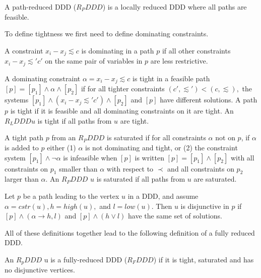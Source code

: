 \begin{mydef}
A path-reduced DDD ($R_PDDD$) is a locally reduced DDD where all paths are feasible.
\end{mydef}

To define tightness we first need to define dominating constraints.

\begin{mydef}
A constraint $x_i - x_j \lesssim c$ is dominating in a path $p$ if all other constraints $x_i - x_j \lesssim' c'$ on the same pair of variables in $p$ are less restrictive.
\end{mydef}

\begin{mydef}
A dominating constraint $\alpha = x_i - x_j \lesssim c$ is tight in a feasible path $[p] = [p_1] \wedge \alpha \wedge [p_2]$ if for all tighter constraints $(c', \lesssim') < (c,\lesssim),$ the systems $[p_1] \wedge (x_i - x_j \lesssim' c') \wedge [p_2]$ and $[p]$ have different solutions. A path $p$ is tight if it is feasible and all dominating constraints on it are tight. An $R_LDDD u$ is tight if all paths from $u$ are tight. 
\end{mydef}

\begin{mydef}
A tight path $p$ from an $R_PDDD$ is saturated if for all constraints $\alpha$ not on $p$, if $\alpha$ is added to $p$ either (1) $\alpha$ is not dominating and tight, or (2) the constraint system $[p_1] \wedge \neg\alpha$ is infeasible when $[p]$ is written $[p] = [p_1] \wedge [p_2]$ with all constraints on $p_1$ smaller than $\alpha$ with respect to $\prec$ and all constraints on $p_2$ larger than $\alpha$. An $R_PDDD$ $u$ is saturated if all paths from $u$ are saturated.
\end{mydef}

\begin{mydef}
Let $p$ be a path leading to the vertex $u$ in a DDD, and assume $\alpha = cstr(u), h = high(u),$ and $l = low(u)$. Then $u$ is disjunctive in $p$ if $[p] \wedge (\alpha \rightarrow h,l)$ and $[p] \wedge (h \vee l)$ have the same set of solutions.
\end{mydef}

All of these definitions together lead to the following definition of a fully reduced DDD.
% 
\begin{mydef}
\label{def:RFDDD}
An $R_pDDD$ u is a fully-reduced DDD ($R_FDDD$) if it is tight, saturated and has no disjunctive vertices.
\end{mydef}

